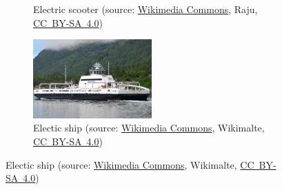 \begin{frame}[c]
\begin{figure}
\begin{subfigure}[b]{0.49\textwidth}
			\caption{Electric scooter (source: \href{https://commons.wikimedia.org/wiki/File:Bolt_Electric_Scooter_\%28Warsaw\%29_in_2020.03.jpg}{Wikimedia Commons}, Raju, \href{https://creativecommons.org/licenses/by-sa/4.0/deed.en}{CC~BY-SA~4.0})}
		\end{subfigure}
		\hfill
		\begin{subfigure}[b]{0.49\textwidth}
			\centering
			\includegraphics[width=0.5\textwidth]{fig/lec01/Electric_ship.jpg}
			\caption{Electic ship (source: \href{https://commons.wikimedia.org/wiki/File:Ferry_Ampere_Sognefjord.jpg}{Wikimedia Commons},  	 	Wikimalte, \href{https://creativecommons.org/licenses/by-sa/4.0/deed.en}{CC~BY-SA~4.0})}
		\end{subfigure}
	\end{figure}
\end{frame}

